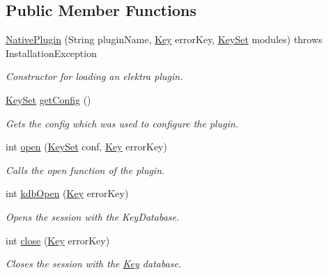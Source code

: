 \subsection*{Public Member Functions}
\begin{DoxyCompactItemize}
\item 
\mbox{\hyperlink{classorg_1_1libelektra_1_1plugin_1_1NativePlugin_ad228084d20bd57c561e49ee755e9c751}{Native\+Plugin}} (String plugin\+Name, \mbox{\hyperlink{classorg_1_1libelektra_1_1Key}{Key}} error\+Key, \mbox{\hyperlink{classorg_1_1libelektra_1_1KeySet}{Key\+Set}} modules)  throws Installation\+Exception 	
\begin{DoxyCompactList}\small\item\em Constructor for loading an elektra plugin. \end{DoxyCompactList}\item 
\mbox{\hyperlink{classorg_1_1libelektra_1_1KeySet}{Key\+Set}} \mbox{\hyperlink{classorg_1_1libelektra_1_1plugin_1_1NativePlugin_af9c78565029ed2ae38241759549e4b5a}{get\+Config}} ()
\begin{DoxyCompactList}\small\item\em Gets the config which was used to configure the plugin. \end{DoxyCompactList}\item 
int \mbox{\hyperlink{classorg_1_1libelektra_1_1plugin_1_1NativePlugin_a81510de92e0d65784e877bf53b89756a}{open}} (\mbox{\hyperlink{classorg_1_1libelektra_1_1KeySet}{Key\+Set}} conf, \mbox{\hyperlink{classorg_1_1libelektra_1_1Key}{Key}} error\+Key)
\begin{DoxyCompactList}\small\item\em Calls the open function of the plugin. \end{DoxyCompactList}\item 
int \mbox{\hyperlink{classorg_1_1libelektra_1_1plugin_1_1NativePlugin_a232c37208b79734c6be8a9f426efa56a}{kdb\+Open}} (\mbox{\hyperlink{classorg_1_1libelektra_1_1Key}{Key}} error\+Key)
\begin{DoxyCompactList}\small\item\em Opens the session with the Key\+Database. \end{DoxyCompactList}\item 
int \mbox{\hyperlink{classorg_1_1libelektra_1_1plugin_1_1NativePlugin_acd6f4e0e81a11a1eba64dfa164c67a1f}{close}} (\mbox{\hyperlink{classorg_1_1libelektra_1_1Key}{Key}} error\+Key)
\begin{DoxyCompactList}\small\item\em Closes the session with the \mbox{\hyperlink{classorg_1_1libelektra_1_1Key}{Key}} database. \end{DoxyCompactList}\item 

\end{DoxyCompactItemize}
